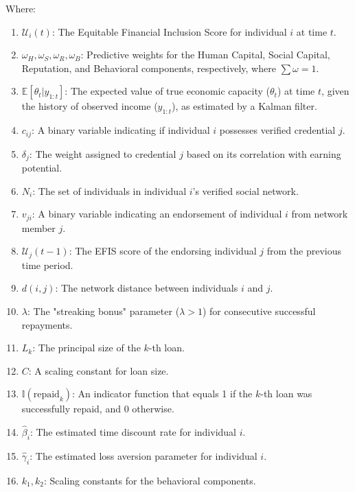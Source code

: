 \documentclass{article}
\begin{document}
Where:
\begin{enumerate}
    \item $\mathcal{U}_i(t)$: The Equitable Financial Inclusion Score for individual $i$ at time $t$.
    \item $\omega_H, \omega_S, \omega_R, \omega_B$: Predictive weights for the Human Capital, Social Capital, Reputation, and Behavioral components, respectively, where $\sum \omega = 1$.
    \item $\mathbb{E}[\theta_t | y_{1:t}]$: The expected value of true economic capacity ($\theta_t$) at time $t$, given the history of observed income ($y_{1:t}$), as estimated by a Kalman filter.
    \item $c_{ij}$: A binary variable indicating if individual $i$ possesses verified credential $j$.
    \item $\delta_j$: The weight assigned to credential $j$ based on its correlation with earning potential.
    \item $N_i$: The set of individuals in individual $i$'s verified social network.
    \item $v_{ji}$: A binary variable indicating an endorsement of individual $i$ from network member $j$.
    \item $\mathcal{U}_j(t-1)$: The EFIS score of the endorsing individual $j$ from the previous time period.
    \item $d(i,j)$: The network distance between individuals $i$ and $j$.
    \item $\lambda$: The "streaking bonus" parameter ($\lambda > 1$) for consecutive successful repayments.
    \item $L_k$: The principal size of the $k$-th loan.
    \item $C$: A scaling constant for loan size.
    \item $\mathbb{I}(\text{repaid}_k)$: An indicator function that equals 1 if the $k$-th loan was successfully repaid, and 0 otherwise.
    \item $\hat{\beta}_i$: The estimated time discount rate for individual $i$.
    \item $\hat{\gamma}_i$: The estimated loss aversion parameter for individual $i$.
    \item $k_1, k_2$: Scaling constants for the behavioral components.
\end{enumerate}
\end{document}
